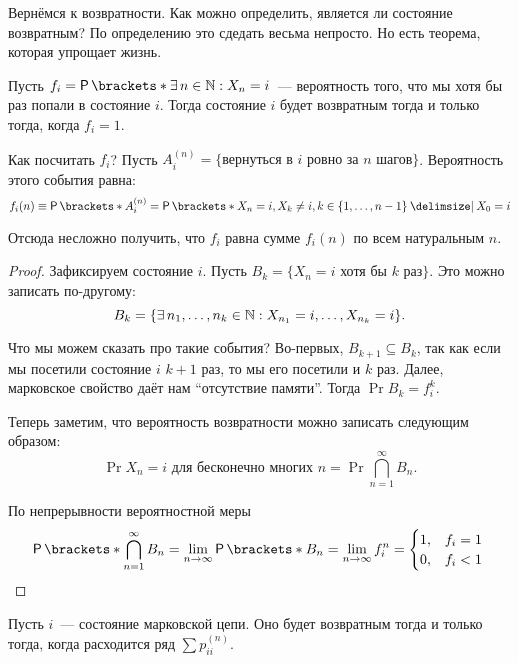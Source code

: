 Вернёмся к возвратности. Как можно определить, является ли состояние 
возвратным? По определению это сдедать весьма непросто. Но есть теорема, 
которая упрощает жизнь.
\begin{theorem}
	Пусть \(f_{i} = \Pr{\exists\,n \in \N : X_{n} = i}\)~--- вероятность того, 
	что мы хотя бы раз попали в состояние \(i\). Тогда состояние \(i\) будет 
	возвратным тогда и только тогда, когда \(f_{i} = 1\).
\end{theorem}

Как посчитать \(f_{i}\)? Пусть \(A_{i}^{(n)} = \{\text{вернуться в }i\text{ 
ровно за }n\text{ шагов}\}\). Вероятность этого события равна:
\[
f_{i}(n) \equiv \Pr{A_{i}^{(n)}} = \Pr{X_{n} = i, X_{k} \neq i, k \in \{1, 
	\dots, n - 1\} \given X_{0} = i}
\]

Отсюда несложно получить, что \(f_{i}\) равна сумме \(f_{i}(n)\) по всем 
натуральным \(n\).
\begin{proof}
	Зафиксируем состояние \(i\). Пусть \(B_{k} = \{X_{n} = i \text{ хотя бы 
	}k\text{ раз}\}\). Это можно записать по-другому:
	\[
		B_{k} = \{\exists\,n_{1}, \ldots, n_{k} \in \mathbb{N} : X_{n_{1}} = i, \ldots, 
		X_{n_{k}} = i\}.
	\] 
	
	Что мы можем сказать про такие события? Во-первых, \(B_{k + 1} \subseteq 
	B_{k}\), так как если мы посетили состояние \(i\) \(k + 1\) раз, то мы его 
	посетили и \(k\) раз. Далее, марковское свойство даёт нам ``отсутствие 
	памяти''. Тогда \(\Pr{B_{k}} = f_{i}^{k}\). 
	
	Теперь заметим, что вероятность возвратности можно записать следующим 
	образом:
	\[
		\Pr{X_{n} = i \text{ для бесконечно многих }n} = \Pr{\bigcap_{n = 
		1}^{\infty} B_{n}}.
	\]
	
	По непрерывности вероятностной меры
	\[
		\Pr{\bigcap_{n = 1}^{\infty} B_{n}} = \lim\limits_{n \to \infty} 
		\Pr{B_{n}} = \lim\limits_{n \to \infty} f_{i}^{n} = 
		\begin{cases}
		1, & f_{i} = 1 \\
		0, & f_{i} < 1
		\end{cases} \qedhere
	\]
\end{proof}
\begin{theorem}\label{recurrent-condition-criterion}
	Пусть \(i\)~--- состояние марковской цепи. Оно будет возвратным тогда и 
	только тогда, когда расходится ряд \(\sum p_{ii}^{(n)}\).
\end{theorem}
